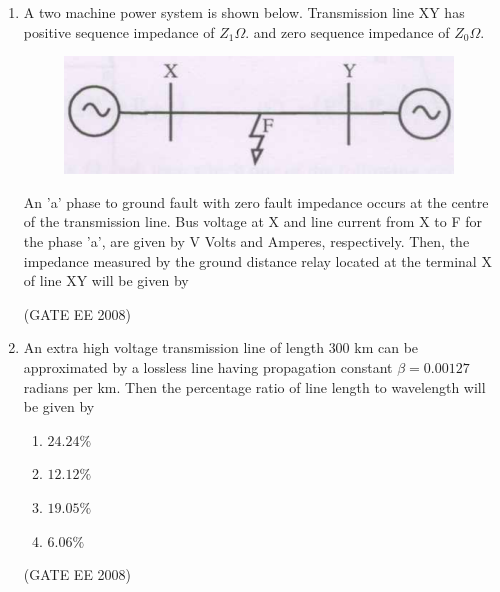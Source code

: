 \documentclass[journal,12pt,onecolumn]{IEEEtran}
\theoremstyle{remark}
\begin{document}
\begin{enumerate}[start=1, label=Q.\arabic*]
\item A two machine power system is shown below. Transmission line XY has positive sequence
impedance of $Z_1 \Omega.$ and zero sequence impedance of $Z_0 \Omega.$ 

\begin{figure}[H]
    \centering
    \includegraphics[width=\columnwidth]{Fig/q14.png}
    \label{fig:placeholder}
\end{figure}

An 'a' phase to ground fault with zero fault impedance occurs at the centre of the transmission line.
Bus voltage at X and line current from X to F for the phase 'a', are given by V Volts and
Amperes, respectively. Then, the impedance measured by the ground distance relay located at the
terminal X of line XY will be given by

\begin{enumerate}[label=(\Alph*)]
\end{enumerate}
\hfill (GATE EE 2008)


\item An extra high voltage transmission line of length $300$ km can be approximated by a lossless line having propagation constant $\beta = 0.00127$ radians per km. Then the percentage ratio of line length to wavelength will be given by

\begin{multicols}{4}
    \begin{enumerate}[label=(\Alph*)]
        \item $24.24 \%$
        \item $12.12 \%$
        \item $19.05 \%$
        \item $6.06 \%$
    \end{enumerate}
\end{multicols}
\hfill (GATE EE 2008)



\end{enumerate}
\end{document}
